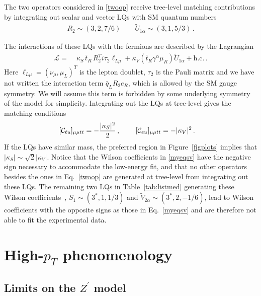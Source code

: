 \documentclass[aps,twocolumn,showpacs,preprintnumbers,amsmath,amssymb,floatfix,nofootinbib]{revtex4-1}
\newcommand{\C}{{\cal C}}
\begin{document}
The two operators considered in \eqref{twoop} receive tree-level matching contributions by integrating out scalar and vector LQs with SM quantum numbers
\begin{align}
R_2 \sim (3,2,7/6) \qquad  \widetilde U_{1 \alpha} \sim (3,1,5/3) \,.
\end{align}



The interactions of these LQs with the fermions are described by the Lagrangian
%
\begin{align} \label{lqlag}
\mathcal{L}=&\;     \kappa_S \,  \bar t_{R}  \,     R_2^{T}  i \tau_2  \ell_{L \mu}     +  \kappa_{V} (  \bar t_{R} \gamma^{\alpha}  \mu_{R})  \widetilde U_{1 \alpha}   +\text{h.c.} \,.
\end{align}  
%
Here $\ell_{ L \mu} = (\nu_{\mu}, \mu_{L})^T$ is the lepton doublet, $\tau_2$ is the Pauli matrix and we have not written the interaction term $\bar q_L R_2 e_R$, which is allowed by the SM gauge symmetry. We will assume this term is forbidden by some underlying symmetry of the model for simplicity.   Integrating out the LQs at tree-level gives the matching conditions~\cite{delAguila:2010mx,Alonso:2015sja,Bobeth:2017ecx}
\begin{align} \label{myeqsv}
[\C_{\ell u}]_{\mu \mu tt}   &=  -  \frac{ |\kappa_S|^2 }{2}  \,, \qquad \, [\C_{e u}]_{\mu \mu tt} =   -   |\kappa_V|^2 \,.
\end{align}
%
If the LQs have similar mass, the preferred region in Figure~\ref{figplots} implies that $|\kappa_S| \sim \sqrt{2} |\kappa_V|$. Notice that the Wilson coefficients in \eqref{myeqsv} have the negative sign necessary to accommodate the low-energy fit, and that no other operators besides the ones in Eq.~\eqref{twoop} are generated at tree-level from integrating out these LQs.  The remaining two LQs in Table~\ref{tab:listmed} generating these Wilson coefficients~\cite{delAguila:2010mx,Alonso:2015sja,Bobeth:2017ecx}, $S_1 \sim (3^*,1,1/3)$ and  $\widetilde V_{2 \alpha} \sim (3^*,2,-1/6)$, lead to Wilson coefficients with the opposite signs as those in Eq.~\eqref{myeqsv} and are therefore not able to fit the experimental data.



\section{High-$p_T$ phenomenology} \label{sechighpt}

\subsection{Limits on the $Z^\prime$ model}
\end{document}
